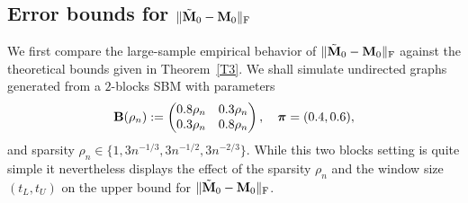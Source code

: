 \documentclass[10pt,journal,compsoc]{IEEEtran}
\newcommand{\bds}{\boldsymbol}
\newcommand{\M}[1]{{{\mathbf{\MakeUppercase{#1}}}}}
\newcommand{\F}{\mathrm{F}}
\numberwithin{equation}{section}
\begin{document}
\subsection{Error bounds for \texorpdfstring{${\|\tilde{\M M}_0 - \M M_0\|_{\F}}$}{TEXT}}
\label{sec:error_bound_simulations}
We first compare the 
large-sample empirical behavior of $\|\tilde{\M M}_0 - \M M_0\|_{\F}$ against the theoretical bounds given in  Theorem~\ref{T3}. We shall simulate undirected graphs
generated from a $2$-blocks SBM with parameters
\begin{equation}\label{Bdef}
  \M B(\rho_n) := \begin{pmatrix} 0.8\rho_n  & 0.3\rho_n
\\ 0.3\rho_n  & 0.8\rho_n \end{pmatrix}, \quad \bds{\pi} = (0.4, 0.6),
\end{equation}
and sparsity $\rho_n \in
\{1, 3n^{-1/3}, 3n^{-1/2}, 3n^{-2/3}\}$.
While this two blocks setting is quite simple it
nevertheless displays the effect of the sparsity
$\rho_n$ and the window size $(t_L, t_U)$ on the upper
bound for ${\|\tilde{\M M}_0 - \M M_0\|_{\F}}$.
\end{document}
